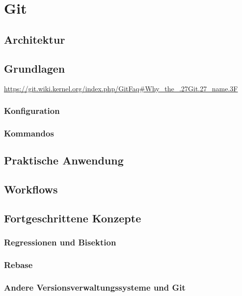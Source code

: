 \chapter{Git}\label{cha:Git}
\section{Architektur}
\label{sec:Architektur}
\section{Grundlagen}
\label{sec:Grundlagen}


\url{https://git.wiki.kernel.org/index.php/GitFaq#Why_the_.27Git.27_name.3F}
\subsection{Konfiguration}
\label{sec:Konfiguration}
\subsection{Kommandos}
\label{sec:Kommandos}
\section{Praktische Anwendung}
\label{sec:Praxis}
\section{Workflows}
\label{sec:Workflows}
\section{Fortgeschrittene Konzepte}
\label{sec:FortgeschritteneKonzepte}
\subsection{Regressionen und Bisektion}
\label{sec:Regressionen}
\subsection{Rebase}
\label{sec:Rebase}
\subsection{Andere Versionsverwaltungssysteme und Git}
\label{sec:AndereVersionsverwaltungssystemeundGit}
